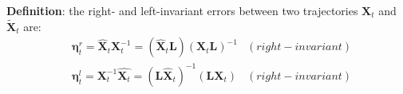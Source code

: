 \textbf{Definition}: the right- and left-invariant errors between two trajectories $\textbf{X}_t$ and $\tilde{\textbf{X}}_t$ are:
\begin{align*}
    & \mathbf{\eta}^r_t = \hat{\textbf{X}}_t\textbf{X}_t^{-1} = (\hat{\textbf{X}}_t\textbf{L})(\textbf{X}_t\textbf{L})^{-1}
    & (right-invariant) \\
    & \mathbf{\eta}^l_t = \textbf{X}_t^{-1}\hat{\textbf{X}_t} = (\textbf{L}\hat{\textbf{X}}_t)^{-1}(\textbf{L}\textbf{X}_t)
    & (right-invariant)
\end{align*}